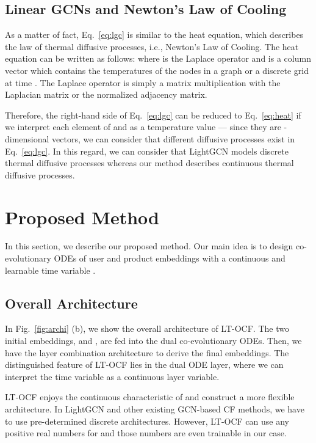 \documentclass[sigconf]{acmart}
\begin{document}
\subsection{Linear GCNs and Newton's Law of Cooling}\label{sec:thermal}
As a matter of fact, Eq.~\eqref{eq:lgc} is similar to the heat equation, which describes the law of thermal diffusive processes, i.e., Newton's Law of Cooling. The heat equation can be written as follows:
where  is the Laplace operator and  is a column vector which contains the temperatures of the nodes in a graph or a discrete grid at time . The Laplace operator  is simply a matrix multiplication with the Laplacian matrix or the normalized adjacency matrix.

Therefore, the right-hand side of Eq.~\eqref{eq:lgc} can be reduced to Eq.~\eqref{eq:heat} if we interpret each element of  and  as a temperature value --- since they are -dimensional vectors, we can consider that  different diffusive processes exist in Eq.~\eqref{eq:lgc}. In this regard, we can consider that LightGCN models discrete thermal diffusive processes whereas our method describes continuous thermal diffusive processes.

\section{Proposed Method}



In this section, we describe our proposed method. Our main idea is to design co-evolutionary ODEs of user and product embeddings with a continuous and learnable time variable . 



\subsection{Overall Architecture}
In Fig.~\ref{fig:archi} (b), we show the overall architecture of LT-OCF. The two initial embeddings,  and , are fed into the dual co-evolutionary ODEs. Then, we have the layer combination architecture to derive the final embeddings. The distinguished feature of LT-OCF lies in the dual ODE layer, where we can interpret the time variable  as a continuous layer variable.

LT-OCF enjoys the continuous characteristic of  and construct a more flexible architecture. In LightGCN and other existing GCN-based CF methods, we have to use pre-determined discrete architectures. However, LT-OCF can use any positive real numbers for  and those numbers are even trainable in our case.
\end{document}
